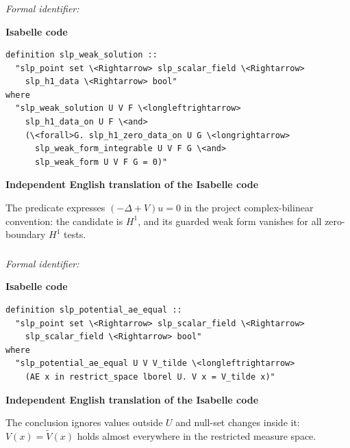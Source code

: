 \documentclass[10pt,oneside]{article}
\newcommand{\reviewlabel}[1]{\par\smallskip\noindent\textsf{\bfseries #1}\par\smallskip}
\begin{document}
\subsubsection{\texttt{}}
\noindent\textit{Formal identifier:} \texttt{}

\reviewlabel{Isabelle code}
\begin{lstlisting}
definition slp_weak_solution ::
  "slp_point set \<Rightarrow> slp_scalar_field \<Rightarrow>
    slp_h1_data \<Rightarrow> bool"
where
  "slp_weak_solution U V F \<longleftrightarrow>
    slp_h1_data_on U F \<and>
    (\<forall>G. slp_h1_zero_data_on U G \<longrightarrow>
      slp_weak_form_integrable U V F G \<and>
      slp_weak_form U V F G = 0)"
\end{lstlisting}

\reviewlabel{Independent English translation of the Isabelle code}
The predicate expresses $(-\Delta+V)u=0$ in the project complex-bilinear convention: the candidate is $H^1$, and its guarded weak form vanishes for all zero-boundary $H^1$ tests.

\subsubsection{\texttt{}}
\noindent\textit{Formal identifier:} \texttt{}

\reviewlabel{Isabelle code}
\begin{lstlisting}
definition slp_potential_ae_equal ::
  "slp_point set \<Rightarrow> slp_scalar_field \<Rightarrow>
    slp_scalar_field \<Rightarrow> bool"
where
  "slp_potential_ae_equal U V V_tilde \<longleftrightarrow>
    (AE x in restrict_space lborel U. V x = V_tilde x)"
\end{lstlisting}

\reviewlabel{Independent English translation of the Isabelle code}
The conclusion ignores values outside $U$ and null-set changes inside it: $V(x)=\widetilde V(x)$ holds almost everywhere in the restricted measure space.
\end{document}
